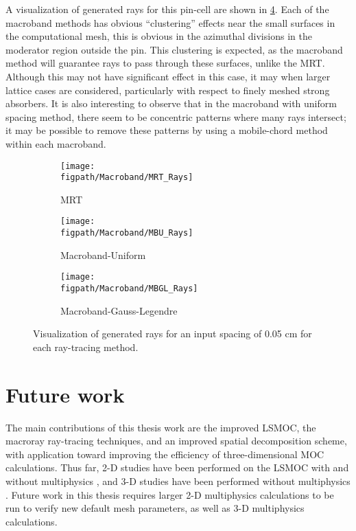 {{        A visualization of generated rays for this pin-cell are shown in \cref{fig:Results:Macroband:Rays}.
        Each of the macroband methods has obvious ``clustering'' effects near the small surfaces in the computational mesh, this is obvious in the azimuthal divisions in the moderator region outside the pin.
        This clustering is expected, as the macroband method will guarantee rays to pass through these surfaces, unlike the \ac{MRT}.
        Although this may not have significant effect in this case, it may when larger lattice cases are considered, particularly with respect to finely meshed strong absorbers.
        It is also interesting to observe that in the macroband with uniform spacing method, there seem to be concentric patterns where many rays intersect; it may be possible to remove these patterns by using a mobile-chord method within each macroband.

        \begin{figure}[h]
          \centering
          \begin{subfigure}[t]{0.45\linewidth}
            \centering
            \texttt{[image: \\figpath/Macroband/MRT\_Rays]}
            \caption{MRT}
            \label{fig:Results:Macroband:Rays:MRT}
          \end{subfigure}
          \begin{subfigure}[t]{0.45\linewidth}
            \centering
            \texttt{[image: \\figpath/Macroband/MBU\_Rays]}
            \caption{Macroband-Uniform}
            \label{fig:Results:Macroband:Rays:MBU}
          \end{subfigure}
          \begin{subfigure}[t]{0.45\linewidth}
            \centering
            \texttt{[image: \\figpath/Macroband/MBGL\_Rays]}
            \caption{Macroband-Gauss-Legendre}
            \label{fig:Results:Macroband:Rays:MBGL}
          \end{subfigure}
          \caption{Visualization of generated rays for an input spacing of 0.05 cm for each ray-tracing method.}
          \label{fig:Results:Macroband:Rays}
        \end{figure}
    }
    \section{Future work}{\label{sec:Results:Future work}
        The main contributions of this thesis work are the improved \ac{LSMOC}, the macroray ray-tracing techniques, and an improved spatial decomposition scheme, with application toward improving the efficiency of three-dimensional \ac{MOC} calculations.
        Thus far, 2-D studies have been performed on the \ac{LSMOC} with and without multiphysics \cite{Ferrer2016,Fitzgerald2019}, and 3-D studies have been performed without multiphysics \cite{Gunow2018}.
        Future work in this thesis requires larger 2-D multiphysics calculations to be run to verify new default mesh parameters, as well as 3-D multiphysics calculations.

}}
